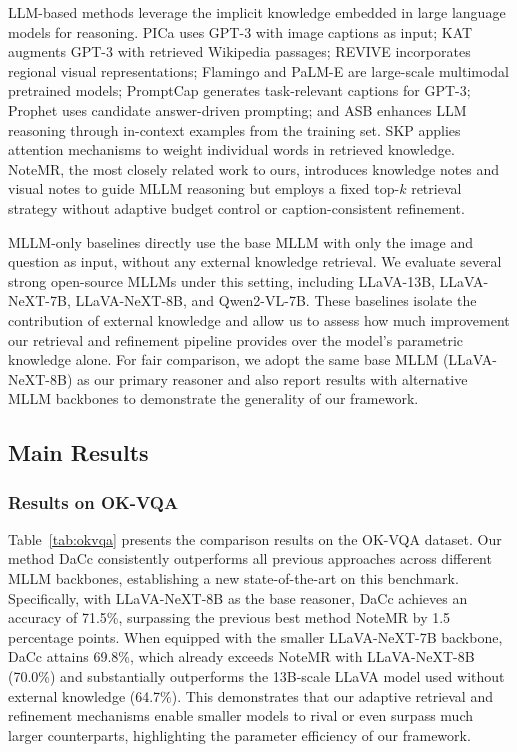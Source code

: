\documentclass[manuscript,screen,review]{acmart}
\begin{document}
LLM-based methods leverage the implicit knowledge embedded in large language models for reasoning. PICa uses GPT-3 with image captions as input; KAT augments GPT-3 with retrieved Wikipedia passages; REVIVE incorporates regional visual representations; Flamingo and PaLM-E are large-scale multimodal pretrained models; PromptCap generates task-relevant captions for GPT-3; Prophet uses candidate answer-driven prompting; and ASB enhances LLM reasoning through in-context examples from the training set. SKP applies attention mechanisms to weight individual words in retrieved knowledge. NoteMR, the most closely related work to ours, introduces knowledge notes and visual notes to guide MLLM reasoning but employs a fixed top-$k$ retrieval strategy without adaptive budget control or caption-consistent refinement.

MLLM-only baselines directly use the base MLLM with only the image and question as input, without any external knowledge retrieval. We evaluate several strong open-source MLLMs under this setting, including LLaVA-13B, LLaVA-NeXT-7B, LLaVA-NeXT-8B, and Qwen2-VL-7B. These baselines isolate the contribution of external knowledge and allow us to assess how much improvement our retrieval and refinement pipeline provides over the model's parametric knowledge alone. For fair comparison, we adopt the same base MLLM (LLaVA-NeXT-8B) as our primary reasoner and also report results with alternative MLLM backbones to demonstrate the generality of our framework.

\subsection{Main Results}

\subsubsection{Results on OK-VQA}

Table~\ref{tab:okvqa} presents the comparison results on the OK-VQA dataset. Our method DaCc consistently outperforms all previous approaches across different MLLM backbones, establishing a new state-of-the-art on this benchmark. Specifically, with LLaVA-NeXT-8B as the base reasoner, DaCc achieves an accuracy of 71.5\%, surpassing the previous best method NoteMR by 1.5 percentage points. When equipped with the smaller LLaVA-NeXT-7B backbone, DaCc attains 69.8\%, which already exceeds NoteMR with LLaVA-NeXT-8B (70.0\%) and substantially outperforms the 13B-scale LLaVA model used without external knowledge (64.7\%). This demonstrates that our adaptive retrieval and refinement mechanisms enable smaller models to rival or even surpass much larger counterparts, highlighting the parameter efficiency of our framework.
\end{document}
